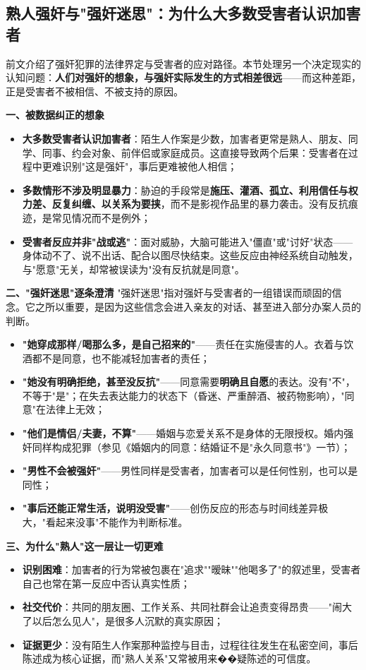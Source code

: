 \subsection{熟人强奸与"强奸迷思"：为什么大多数受害者认识加害者}

前文介绍了强奸犯罪的法律界定与受害者的应对路径。本节处理另一个决定现实的认知问题：\textbf{人们对强奸的想象，与强奸实际发生的方式相差很远}——而这种差距，正是受害者不被相信、不被支持的原因。

\textbf{一、被数据纠正的想象}
\begin{itemize}
\item \textbf{大多数受害者认识加害者}：陌生人作案是少数，加害者更常是熟人、朋友、同学、同事、约会对象、前伴侣或家庭成员。这直接导致两个后果：受害者在过程中更难识别"这是强奸"，事后更难被他人相信；
\item \textbf{多数情形不涉及明显暴力}：胁迫的手段常是\textbf{施压、灌酒、孤立、利用信任与权力差、反复纠缠、以关系为要挟}，而不是影视作品里的暴力袭击。没有反抗痕迹，是常见情况而不是例外；
\item \textbf{受害者反应并非"战或逃"}：面对威胁，大脑可能进入"僵直"或"讨好"状态——身体动不了、说不出话、配合以图尽快结束。这些反应由神经系统自动触发，与"愿意"无关，却常被误读为"没有反抗就是同意"。
\end{itemize}

\textbf{二、"强奸迷思"逐条澄清}
"强奸迷思"指对强奸与受害者的一组错误而顽固的信念。它之所以重要，是因为这些信念会进入亲友的对话、甚至进入部分办案人员的判断。
\begin{itemize}
\item \textbf{"她穿成那样/喝那么多，是自己招来的"}——责任在实施侵害的人。衣着与饮酒都不是同意，也不能减轻加害者的责任；
\item \textbf{"她没有明确拒绝，甚至没反抗"}——同意需要\textbf{明确且自愿}的表达。没有"不"，不等于"是"；在失去表达能力的状态下（昏迷、严重醉酒、被药物影响），"同意"在法律上无效；
\item \textbf{"他们是情侣/夫妻，不算"}——婚姻与恋爱关系不是身体的无限授权。婚内强奸同样构成犯罪（参见《婚姻内的同意：结婚证不是"永久同意书"》一节）；
\item \textbf{"男性不会被强奸"}——男性同样是受害者，加害者可以是任何性别，也可以是同性；
\item \textbf{"事后还能正常生活，说明没受害"}——创伤反应的形态与时间线差异极大，"看起来没事"不能作为判断标准。
\end{itemize}

\textbf{三、为什么"熟人"这一层让一切更难}
\begin{itemize}
\item \textbf{识别困难}：加害者的行为常被包裹在"追求""暧昧""他喝多了"的叙述里，受害者自己也常在第一反应中否认真实性质；
\item \textbf{社交代价}：共同的朋友圈、工作关系、共同社群会让追责变得昂贵——"闹大了以后怎么见人"，是很多人沉默的真实原因；
\item \textbf{证据更少}：没有陌生人作案那种监控与目击，过程往往发生在私密空间，事后陈述成为核心证据，而"熟人关系"又常被用来��疑陈述的可信度。
\end{itemize}

